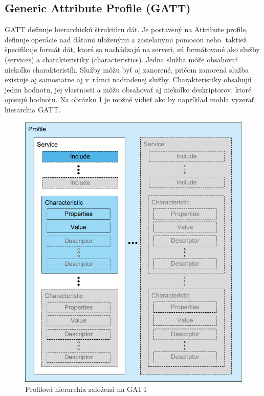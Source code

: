 \subsection{Generic Attribute Profile (GATT)}\label{sec:gatt}

GATT definuje hierarchickú štruktúru dát. Je postavený na Attribute profile, definuje operácie nad dátami uloženými a zasielanými pomocou neho. taktiež špecifikuje formát dát, ktoré sa nachádzajú na serveri, sú formátované ako služby (services) a charakteristiky (characteristics). Jedna služba môže obsahovať niekoľko charakteristík. Služby môžu byť aj zanorené, pričom zanorená služba existuje aj samostatne aj v~rámci nadradenej služby. Charakteristiky obsahujú jednu hodnotu, jej vlastnosti a môžu obsahovať aj niekoľko deskriptorov, ktoré opisujú hodnotu. Na obrázku \ref{fig:gatt} je možné vidieť ako by napríklad mohla vyzerať hierarchia GATT.\cite{bluetooth}

\begin{figure}[ht]
    \centering
    \includegraphics[scale=0.4]{obrazky-figures/gatt.png}
    \caption[Profilová hierarchia založená na GATT]{Profilová hierarchia založená na GATT\cite{bluetooth}}
    \label{fig:gatt}
\end{figure}


